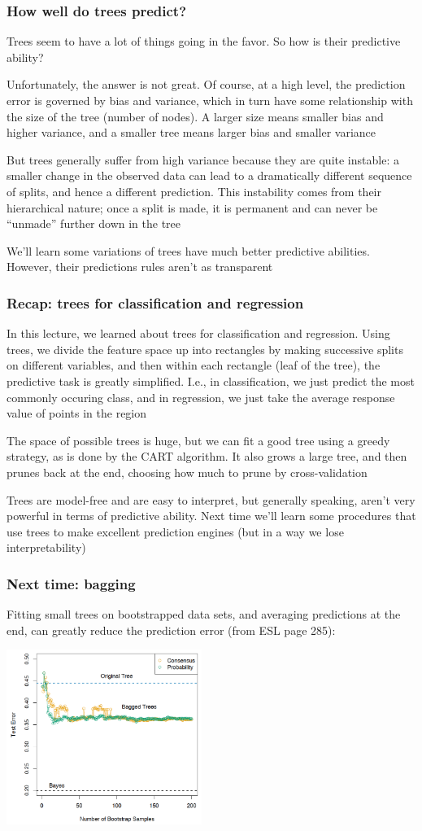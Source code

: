 \documentclass[mathserif]{beamer}
\def\red{\color[rgb]{0.8,0,0}}
\begin{document}
\begin{frame}
\frametitle{How well do trees predict?}
\smallskip
Trees seem to have a lot of things going in the favor. So how is their 
predictive ability?

\bigskip
Unfortunately, the answer is {\red not great}. Of course, at a high level, 
the prediction error is governed by bias and variance, which in turn
have some relationship with the size of the tree (number of nodes). 
A larger size means smaller bias and higher variance, and a smaller
tree means larger bias and smaller variance

\bigskip
But trees generally suffer from high variance because they are quite
{\red instable}: a smaller change in the observed data can lead to a 
dramatically different sequence of splits, and hence a different prediction.
This instability comes from their hierarchical nature; once a split is made,
it is permanent and can never be ``unmade'' further down in the tree

\bigskip
We'll learn some variations of trees have {\red much better} predictive
abilities. However, their predictions rules aren't as transparent
\end{frame}

\begin{frame}
\frametitle{Recap: trees for classification and regression}
In this lecture, we learned about {\red trees} for classification and 
regression. Using trees, we divide the feature space up into rectangles
by making successive splits on different variables, and then within
each rectangle (leaf of the tree), the predictive task is greatly 
{\red simplified}. I.e., in classification, we just predict the most
commonly occuring class, and in regression, we just take the average
response value of points in the region

\bigskip
The space of possible trees is huge, but we can fit a good tree using
a {\red greedy} strategy, as is done by the {\red CART algorithm}.
It also grows a large tree, and then prunes back at the end, choosing
how much to prune by cross-validation

\bigskip
Trees are model-free and are easy to interpret, but generally speaking,
aren't very powerful in terms of predictive ability. Next time we'll learn
some procedures that use trees to make excellent prediction engines (but
in a way we lose interpretability)
\end{frame}


\begin{frame}
\frametitle{Next time: bagging}
\smallskip
Fitting small trees on bootstrapped data sets, and averaging predictions
at the end, can greatly reduce the prediction error (from ESL page 285):

\begin{center}
\includegraphics[width=2.5in]{bagging.png}
\end{center}
\end{frame}
\end{document}
